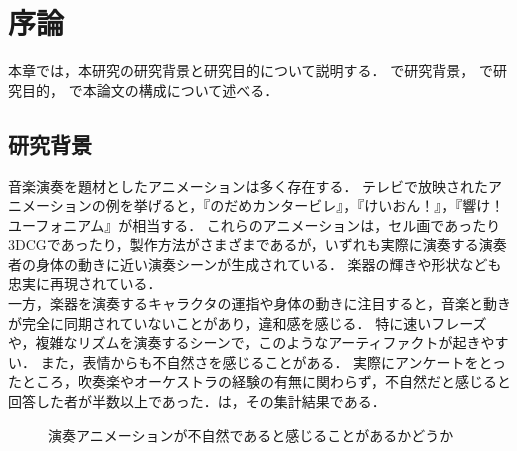 \chapter{序論}
\label{chap:intro}

本章では，本研究の研究背景と研究目的について説明する．
で研究背景，
で研究目的，
で本論文の構成について述べる．

\section{研究背景}\label{sec:background}
\indent
音楽演奏を題材としたアニメーションは多く存在する．
テレビで放映されたアニメーションの例を挙げると，『のだめカンタービレ』，『けいおん！』，『響け！ユーフォニアム』が相当する．
これらのアニメーションは，セル画であったり3DCGであったり，製作方法がさまざまであるが，いずれも実際に演奏する演奏者の身体の動きに近い演奏シーンが生成されている．
楽器の輝きや形状なども忠実に再現されている．\\
\indent
一方，楽器を演奏するキャラクタの運指や身体の動きに注目すると，音楽と動きが完全に同期されていないことがあり，違和感を感じる．
特に速いフレーズや，複雑なリズムを演奏するシーンで，このようなアーティファクトが起きやすい．
また，表情からも不自然さを感じることがある．
実際にアンケートをとったところ，吹奏楽やオーケストラの経験の有無に関わらず，不自然だと感じると回答した者が半数以上であった．は，その集計結果である．
\begin{figure}[h]
	\centering
	\caption{演奏アニメーションが不自然であると感じることがあるかどうか}
	\label{fig:q1}
\end{figure}

